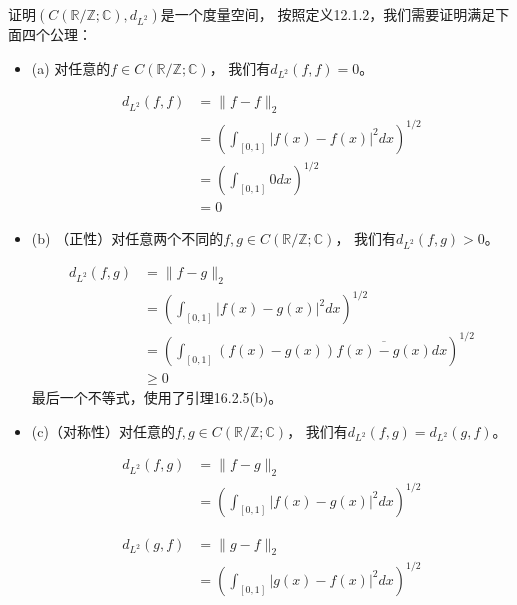 \documentclass{article}
\begin{document}
证明$(C(\mathbb{R}/\mathbb{Z};\mathbb{C}), d_{L^2})$是一个度量空间，
按照定义12.1.2，我们需要证明满足下面四个公理：
\begin{itemize}
  \item (a) 对任意的$f \in C(\mathbb{R}/\mathbb{Z};\mathbb{C})$，
        我们有$d_{L^2}(f, f) = 0$。

        \begin{align*}
          d_{L^2}(f, f) & = \| f - f\|_2                                       \\
                        & = \left(\int_{[0, 1]} |f(x) - f(x)|^2dx\right)^{1/2} \\
                        & = \left(\int_{[0, 1]} 0 dx\right)^{1/2}              \\
                        & = 0
        \end{align*}

  \item (b) （正性）对任意两个不同的$f, g \in C(\mathbb{R}/\mathbb{Z};\mathbb{C})$，
        我们有$d_{L^2}(f, g) > 0$。

        \begin{align*}
          d_{L^2}(f, g) & = \| f - g\|_2                                                            \\
                        & = \left(\int_{[0, 1]} |f(x) - g(x)|^2dx\right)^{1/2}                      \\
                        & = \left(\int_{[0, 1]} (f(x) - g(x))\overline{f(x) - g(x)} dx\right)^{1/2} \\
                        & \geq 0
        \end{align*}
        最后一个不等式，使用了引理16.2.5(b)。

  \item (c)（对称性）对任意的$f, g \in C(\mathbb{R}/\mathbb{Z};\mathbb{C})$，
        我们有$d_{L^2}(f, g) = d_{L^2}(g, f)$。

        \begin{align*}
          d_{L^2}(f, g) & = \| f - g\|_2                                       \\
                        & = \left(\int_{[0, 1]} |f(x) - g(x)|^2dx\right)^{1/2}
        \end{align*}

        \begin{align*}
          d_{L^2}(g, f) & = \| g - f\|_2                                       \\
                        & = \left(\int_{[0, 1]} |g(x) - f(x)|^2dx\right)^{1/2}
        \end{align*}


\end{itemize}
\end{document}
